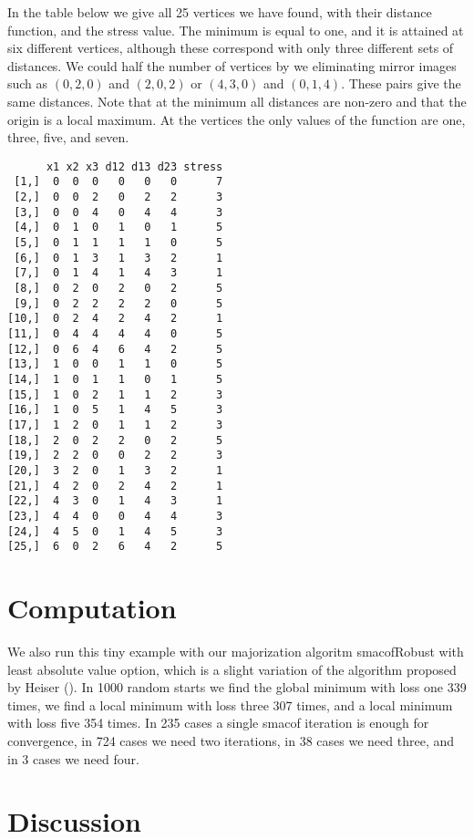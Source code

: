 \documentclass[
  12pt,
  letterpaper,
  DIV=11,
  numbers=noendperiod]{scrartcl}
\begin{document}
In the table below we give all 25 vertices we have found, with their
distance function, and the stress value. The minimum is equal to one,
and it is attained at six different vertices, although these correspond
with only three different sets of distances. We could half the number of
vertices by we eliminating mirror images such as \((0,2,0)\) and
\((2,0,2)\) or \((4,3,0)\) and \((0,1,4)\). These pairs give the same
distances. Note that at the minimum all distances are non-zero and that
the origin is a local maximum. At the vertices the only values of the
function are one, three, five, and seven.

\begin{verbatim}
      x1 x2 x3 d12 d13 d23 stress
 [1,]  0  0  0   0   0   0      7
 [2,]  0  0  2   0   2   2      3
 [3,]  0  0  4   0   4   4      3
 [4,]  0  1  0   1   0   1      5
 [5,]  0  1  1   1   1   0      5
 [6,]  0  1  3   1   3   2      1
 [7,]  0  1  4   1   4   3      1
 [8,]  0  2  0   2   0   2      5
 [9,]  0  2  2   2   2   0      5
[10,]  0  2  4   2   4   2      1
[11,]  0  4  4   4   4   0      5
[12,]  0  6  4   6   4   2      5
[13,]  1  0  0   1   1   0      5
[14,]  1  0  1   1   0   1      5
[15,]  1  0  2   1   1   2      3
[16,]  1  0  5   1   4   5      3
[17,]  1  2  0   1   1   2      3
[18,]  2  0  2   2   0   2      5
[19,]  2  2  0   0   2   2      3
[20,]  3  2  0   1   3   2      1
[21,]  4  2  0   2   4   2      1
[22,]  4  3  0   1   4   3      1
[23,]  4  4  0   0   4   4      3
[24,]  4  5  0   1   4   5      3
[25,]  6  0  2   6   4   2      5
\end{verbatim}

\section{Computation}\label{computation}

We also run this tiny example with our majorization algoritm
smacofRobust with least absolute value option, which is a slight
variation of the algorithm proposed by Heiser
(). In 1000 random starts we find the
global minimum with loss one 339 times, we find a local minimum with
loss three 307 times, and a local minimum with loss five 354 times. In
235 cases a single smacof iteration is enough for convergence, in 724
cases we need two iterations, in 38 cases we need three, and in 3 cases
we need four.

\section{Discussion}\label{discussion}
\end{document}

